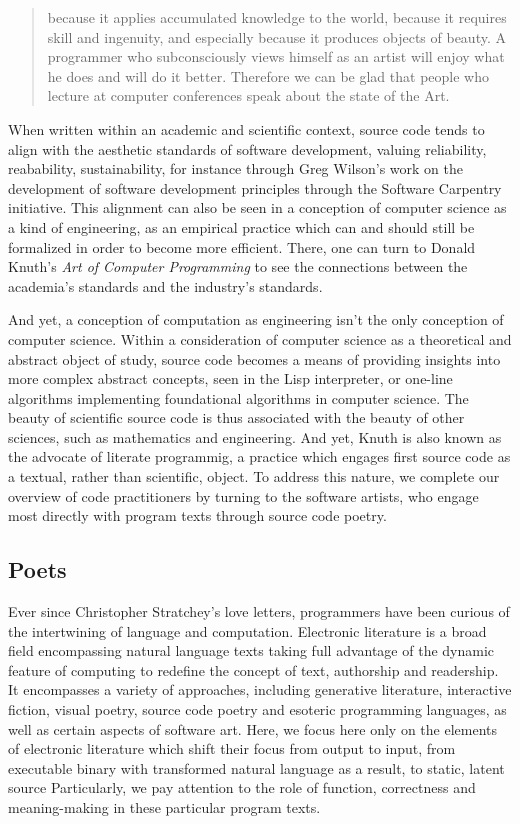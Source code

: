 \begin{quote}
  because it applies accumulated knowledge to the world, because it requires skill and ingenuity, and especially because it produces objects of beauty. A programmer who subconsciously views himself as an artist will enjoy what he does and will do it better. Therefore we can be glad that people who lecture at computer conferences speak about the state of the Art. \citep{knuth_computer_1974}
\end{quote}

When written within an academic and scientific context, source code tends to align with the aesthetic standards of software development, valuing reliability, reabability, sustainability, for instance through Greg Wilson's work on the development of software development principles through the Software Carpentry initiative. This alignment can also be seen in a conception of computer science as a kind of engineering, as an empirical practice which can and should still be formalized in order to become more efficient. There, one can turn to Donald Knuth's \emph{Art of Computer Programming} to see the connections between the academia's standards and the industry's standards.

And yet, a conception of computation as engineering isn't the only conception of computer science. Within a consideration of computer science as a  theoretical and abstract object of study, source code becomes a means of providing insights into more complex abstract concepts, seen in the Lisp interpreter, or one-line algorithms implementing foundational algorithms in computer science. The beauty of scientific source code is thus associated with the beauty of other sciences, such as mathematics and engineering. And yet, Knuth is also known as the advocate of literate programmig, a practice which engages first source code as a textual, rather than scientific, object. To address this nature, we complete our overview of code practitioners by turning to the software artists, who engage most directly with program texts through source code poetry.

\subsection{Poets}
\label{subsec:poets}

Ever since Christopher Stratchey's love letters, programmers have been curious of the intertwining of language and computation. Electronic literature is a broad field encompassing natural language texts taking full advantage of the dynamic feature of computing to redefine the concept of text, authorship and readership. It encompasses a variety of approaches, including generative literature, interactive fiction, visual poetry, source code poetry and esoteric programming languages, as well as certain aspects of software art. Here, we focus here only on the elements of electronic literature which shift their focus from output to input, from executable binary with transformed natural language as a result, to static, latent source Particularly, we pay attention to the role of function, correctness and meaning-making in these particular program texts.

